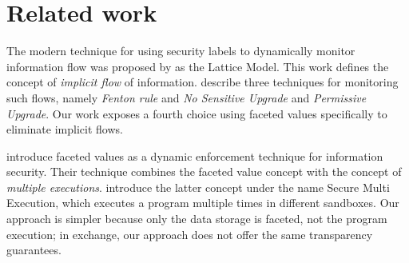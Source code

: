 \section{Related work}

The modern technique for using security labels to dynamically monitor information flow was proposed by \citet{Denning-76-CACM} as the Lattice Model. This work defines the concept of \textit{implicit flow} of information. \citet{Austin-Cormac-10-PLAS} describe three techniques for monitoring such flows, namely \textit{Fenton rule} and \textit{No Sensitive Upgrade} and \textit{Permissive Upgrade}. Our work exposes a fourth choice using faceted values specifically to eliminate implicit flows.

\citet{Austin-Flanagan-12-POPL} introduce faceted values as a dynamic enforcement technique for information security. Their technique combines the faceted value concept with the concept of \textit{multiple executions}. \citet{Devriese-Piessens-10-SSP} introduce the latter concept under the name Secure Multi Execution, which executes a program multiple times in different sandboxes. Our approach is simpler because only the data storage is faceted, not the program execution; in exchange, our approach does not offer the same transparency guarantees.

